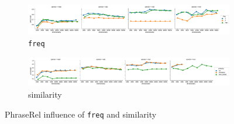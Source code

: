 \begin{figure}[t]
  \centering

  \begin{subfigure}[t]{\textwidth}
    \includegraphics[width=1.1\textwidth]{supplement/figures/phraserel-interaction-freq}

  \caption{\texttt{freq}}
  \label{fig:phraserel-freq}
  \end{subfigure}

  \begin{subfigure}[t]{\textwidth}
    \includegraphics[width=1.1\textwidth]{supplement/figures/phraserel-interaction-similarity}

  \caption{similarity}
  \label{fig:phraserel-similarity}
  \end{subfigure}

  \caption{PhraseRel influence of \texttt{freq} and similarity}
\end{figure}
